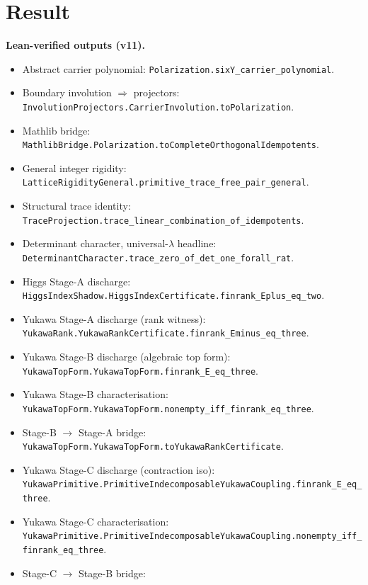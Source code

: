 \documentclass[11pt,a4paper]{article}
\begin{document}
\section{Result}

\begin{tfptexports}
\textbf{Lean-verified outputs (v11).}
\begin{itemize}[leftmargin=1.5em, itemsep=0pt]
\item Abstract carrier polynomial:
  \texttt{Polarization.sixY\_carrier\_polynomial}.
\item Boundary involution $\Rightarrow$ projectors:
  \texttt{InvolutionProjectors.CarrierInvolution.toPolarization}.
\item Mathlib bridge:
  \texttt{MathlibBridge.Polarization.toCompleteOrthogonalIdempotents}.
\item General integer rigidity:
  \texttt{LatticeRigidityGeneral.primitive\_trace\_free\_pair\_general}.
\item Structural trace identity:
  \texttt{TraceProjection.trace\_linear\_combination\_of\_idempotents}.
\item Determinant character, universal-$\lambda$ headline:
  \texttt{DeterminantCharacter.trace\_zero\_of\_det\_one\_forall\_rat}.
\item Higgs Stage-A discharge:
  \texttt{HiggsIndexShadow.HiggsIndexCertificate.finrank\_Eplus\_eq\_two}.
\item Yukawa Stage-A discharge (rank witness):
  \texttt{YukawaRank.YukawaRankCertificate.finrank\_Eminus\_eq\_three}.
\item Yukawa Stage-B discharge (algebraic top form):
  \texttt{YukawaTopForm.YukawaTopForm.finrank\_E\_eq\_three}.
\item Yukawa Stage-B characterisation:
  \texttt{YukawaTopForm.YukawaTopForm.nonempty\_iff\_finrank\_eq\_three}.
\item Stage-B $\to$ Stage-A bridge:
  \texttt{YukawaTopForm.YukawaTopForm.toYukawaRankCertificate}.
\item Yukawa Stage-C discharge (contraction iso):
  \texttt{YukawaPrimitive.PrimitiveIndecomposableYukawaCoupling.finrank\_E\_eq\_three}.
\item Yukawa Stage-C characterisation:
  \texttt{YukawaPrimitive.PrimitiveIndecomposableYukawaCoupling.nonempty\_iff\_finrank\_eq\_three}.
\item Stage-C $\to$ Stage-B bridge:

\end{itemize}
\end{tfptexports}
\end{document}
